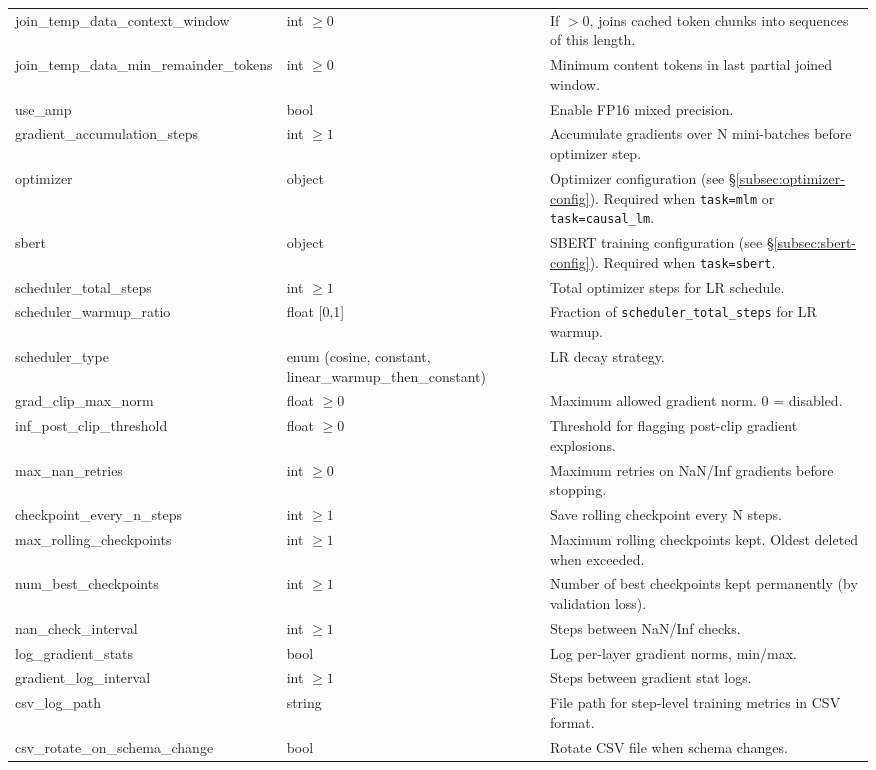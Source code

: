 \begin{longtable}{>{\ttfamily\footnotesize\raggedright\arraybackslash}p{5.6cm}>{\raggedright\arraybackslash}p{2.4cm}>{\raggedright\arraybackslash}p{6.9cm}}
join\_temp\_data\_context\_window & int $\ge 0$ & If $>0$, joins cached token chunks into sequences of this length. \\
join\_temp\_data\_min\_remainder\_tokens & int $\ge 0$ & Minimum content tokens in last partial joined window. \\
use\_amp & bool & Enable FP16 mixed precision. \\
gradient\_accumulation\_steps & int $\ge 1$ & Accumulate gradients over N mini-batches before optimizer step. \\
optimizer & object & Optimizer configuration (see \S\ref{subsec:optimizer-config}). Required when \texttt{task=mlm} or \texttt{task=causal\_lm}. \\
sbert & object & SBERT training configuration (see \S\ref{subsec:sbert-config}). Required when \texttt{task=sbert}. \\
scheduler\_total\_steps & int $\ge 1$ & Total optimizer steps for LR schedule. \\
scheduler\_warmup\_ratio & float [0,1] & Fraction of \texttt{scheduler\_total\_steps} for LR warmup. \\
scheduler\_type & enum (cosine, constant, linear\_warmup\_then\_constant) & LR decay strategy. \\
grad\_clip\_max\_norm & float $\ge 0$ & Maximum allowed gradient norm. 0 = disabled. \\
inf\_post\_clip\_threshold & float $\ge 0$ & Threshold for flagging post-clip gradient explosions. \\
max\_nan\_retries & int $\ge 0$ & Maximum retries on NaN/Inf gradients before stopping. \\
checkpoint\_every\_n\_steps & int $\ge 1$ & Save rolling checkpoint every N steps. \\
max\_rolling\_checkpoints & int $\ge 1$ & Maximum rolling checkpoints kept. Oldest deleted when exceeded. \\
num\_best\_checkpoints & int $\ge 1$ & Number of best checkpoints kept permanently (by validation loss). \\
nan\_check\_interval & int $\ge 1$ & Steps between NaN/Inf checks. \\
log\_gradient\_stats & bool & Log per-layer gradient norms, min/max. \\
gradient\_log\_interval & int $\ge 1$ & Steps between gradient stat logs. \\
csv\_log\_path & string & File path for step-level training metrics in CSV format. \\
csv\_rotate\_on\_schema\_change & bool & Rotate CSV file when schema changes. \\

\end{longtable}
